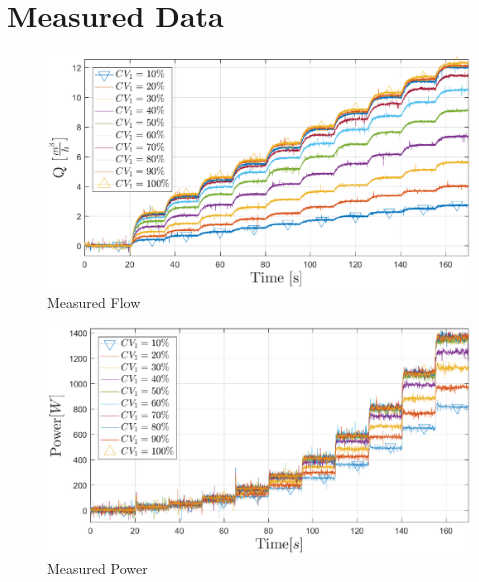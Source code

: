 \chapter{Measured Data}
\label{app:gatheredData}
\newpage
\begin{figure}[H]
	\centering
	\includegraphics[height=\textwidth, width=\textheight, keepaspectratio, angle=270]{figures/05mathematicalModelling/measuredFlow.eps}
	\caption{Measured Flow}
\end{figure}

\begin{figure}[H]
	\centering
	\includegraphics[height=\textwidth, width=\textheight, keepaspectratio, angle=270]{figures/05mathematicalModelling/measuredPower.eps}
	\caption{Measured Power}
\end{figure}

